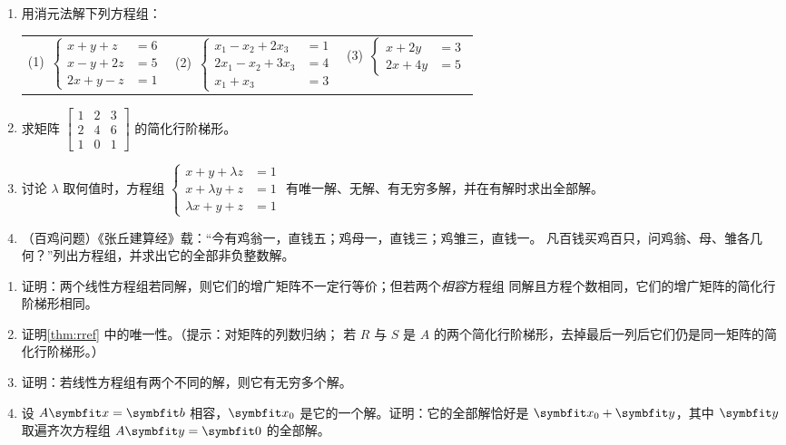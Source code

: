 \begin{exercises}
\begin{enumerate}
  \item 用消元法解下列方程组：
  \par\smallskip
  \begin{tabular}{@{}l@{\qquad}l@{\qquad}l@{}}
    (1)~$\left\{\begin{aligned}x+y+z&=6\\x-y+2z&=5\\2x+y-z&=1\end{aligned}\right.$ &
    (2)~$\left\{\begin{aligned}x_1-x_2+2x_3&=1\\2x_1-x_2+3x_3&=4\\x_1+x_3&=3\end{aligned}\right.$ &
    (3)~$\left\{\begin{aligned}x+2y&=3\\2x+4y&=5\end{aligned}\right.$
  \end{tabular}
  \item 求矩阵 $\begin{bmatrix}1&2&3\\2&4&6\\1&0&1\end{bmatrix}$ 的简化行阶梯形。
  \item 讨论 $\lambda$ 取何值时，方程组
        $\left\{\begin{aligned}x+y+\lambda z&=1\\x+\lambda y+z&=1\\\lambda x+y+z&=1\end{aligned}\right.$
        有唯一解、无解、有无穷多解，并在有解时求出全部解。
  \item （百鸡问题）《张丘建算经》载：“今有鸡翁一，直钱五；鸡母一，直钱三；鸡雏三，直钱一。
        凡百钱买鸡百只，问鸡翁、母、雏各几何？”列出方程组，并求出它的全部非负整数解。
\end{enumerate}
\begin{enumerate}
  \item 证明：两个线性方程组若同解，则它们的增广矩阵不一定行等价；但若两个\emph{相容}方程组
        同解且方程个数相同，它们的增广矩阵的简化行阶梯形相同。
  \item\label{ex:rref-unique} 证明\cref{thm:rref} 中的唯一性。（提示：对矩阵的列数归纳；
        若 $R$ 与 $S$ 是 $A$ 的两个简化行阶梯形，去掉最后一列后它们仍是同一矩阵的简化行阶梯形。）
  \item\label{ex:two-solutions} 证明：若线性方程组有两个不同的解，则它有无穷多个解。
  \item 设 $A\vb{x}=\vb{b}$ 相容，$\vb{x}_0$ 是它的一个解。证明：它的全部解恰好是
        $\vb{x}_0+\vb{y}$，其中 $\vb{y}$ 取遍齐次方程组 $A\vb{y}=\vb{0}$ 的全部解。
\end{enumerate}
\end{exercises}

